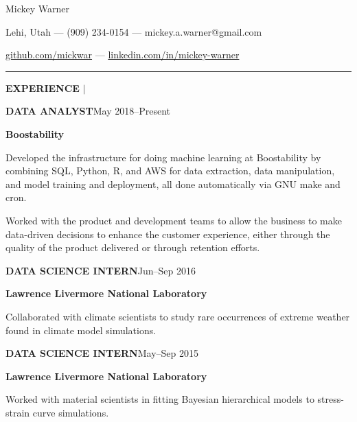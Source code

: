 \documentclass[12pt]{article}
\newcommand{\entrypar}[5]{
    \textbf{\MakeUppercase{#1}}\hfill #3--#4

    \textbf{#2}

    #5
    }
\begin{document}

\begin{center}
\begin{Huge}
Mickey Warner
\end{Huge}
\end{center}

\hspace{85pt} Lehi, Utah --- (909) 234-0154 --- mickey.a.warner@gmail.com

\hspace{85pt} \href{https://www.github.com/mickwar}{github.com/mickwar} --- \href{https://www.linkedin.com/in/mickey-warner/}{linkedin.com/in/mickey-warner}
\smallskip
\smallskip

\hrule

\bigskip

\begin{minipage}[t]{0.19\textwidth}
    \begin{flushright}
        \textbf{EXPERIENCE} $\vert$ \ \
    \end{flushright}
\end{minipage}%
%
\begin{minipage}[t]{0.81\textwidth}
    \begin{flushleft}
        \entrypar{Data analyst}{Boostability}{May 2018}{Present}{
Developed the infrastructure for doing machine learning at Boostability by combining SQL, Python, R, and AWS for data extraction, data manipulation, and model training and deployment, all done automatically via GNU make and cron.
\bigskip

Worked with the product and development teams to allow the business to make data-driven decisions to enhance the customer experience, either through the quality of the product delivered or through retention efforts.
        }

        \bigskip

        \entrypar{Data science intern}{Lawrence Livermore National Laboratory}{Jun}{Sep 2016}{
Collaborated with climate scientists to study rare occurrences of extreme weather found in climate model simulations.
        }
        \bigskip

        \entrypar{Data science intern}{Lawrence Livermore National Laboratory}{May}{Sep 2015}{
Worked with material scientists in fitting Bayesian hierarchical models to stress-strain curve simulations.
        }
    \end{flushleft}
\end{minipage}
\end{document}
